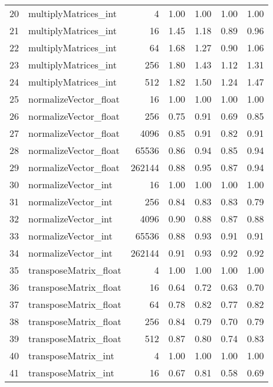 \begin{tabular}{rlrrrrr}
 20 & multiplyMatrices\_int   &      4 &   1.00 &     1.00 &   1.00 &     1.00 \\
 21 & multiplyMatrices\_int   &     16 &   1.45 &     1.18 &   0.89 &     0.96 \\
 22 & multiplyMatrices\_int   &     64 &   1.68 &     1.27 &   0.90 &     1.06 \\
 23 & multiplyMatrices\_int   &    256 &   1.80 &     1.43 &   1.12 &     1.31 \\
 24 & multiplyMatrices\_int   &    512 &   1.82 &     1.50 &   1.24 &     1.47 \\
 25 & normalizeVector\_float  &     16 &   1.00 &     1.00 &   1.00 &     1.00 \\
 26 & normalizeVector\_float  &    256 &   0.75 &     0.91 &   0.69 &     0.85 \\
 27 & normalizeVector\_float  &   4096 &   0.85 &     0.91 &   0.82 &     0.91 \\
 28 & normalizeVector\_float  &  65536 &   0.86 &     0.94 &   0.85 &     0.94 \\
 29 & normalizeVector\_float  & 262144 &   0.88 &     0.95 &   0.87 &     0.94 \\
 30 & normalizeVector\_int    &     16 &   1.00 &     1.00 &   1.00 &     1.00 \\
 31 & normalizeVector\_int    &    256 &   0.84 &     0.83 &   0.83 &     0.79 \\
 32 & normalizeVector\_int    &   4096 &   0.90 &     0.88 &   0.87 &     0.88 \\
 33 & normalizeVector\_int    &  65536 &   0.88 &     0.93 &   0.91 &     0.91 \\
 34 & normalizeVector\_int    & 262144 &   0.91 &     0.93 &   0.92 &     0.92 \\
 35 & transposeMatrix\_float  &      4 &   1.00 &     1.00 &   1.00 &     1.00 \\
 36 & transposeMatrix\_float  &     16 &   0.64 &     0.72 &   0.63 &     0.70 \\
 37 & transposeMatrix\_float  &     64 &   0.78 &     0.82 &   0.77 &     0.82 \\
 38 & transposeMatrix\_float  &    256 &   0.84 &     0.79 &   0.70 &     0.79 \\
 39 & transposeMatrix\_float  &    512 &   0.87 &     0.80 &   0.74 &     0.83 \\
 40 & transposeMatrix\_int    &      4 &   1.00 &     1.00 &   1.00 &     1.00 \\
 41 & transposeMatrix\_int    &     16 &   0.67 &     0.81 &   0.58 &     0.69 \\

\end{tabular}
